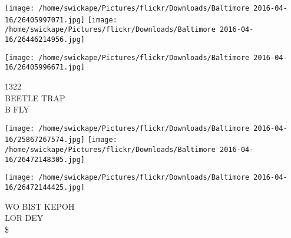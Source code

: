 \documentclass[10pt,letterpaper]{article}
\begin{document}
\texttt{[image: /home/swickape/Pictures/flickr/Downloads/Baltimore 2016-04-16/26405997071.jpg]}
\texttt{[image: /home/swickape/Pictures/flickr/Downloads/Baltimore 2016-04-16/26446214956.jpg]}

\vspace{0.25in}
\texttt{[image: /home/swickape/Pictures/flickr/Downloads/Baltimore 2016-04-16/26405996671.jpg]}

1322\\
BEETLE TRAP\\
B FLY\\
\pagebreak

\texttt{[image: /home/swickape/Pictures/flickr/Downloads/Baltimore 2016-04-16/25867267574.jpg]}
\texttt{[image: /home/swickape/Pictures/flickr/Downloads/Baltimore 2016-04-16/26472148305.jpg]}

\texttt{[image: /home/swickape/Pictures/flickr/Downloads/Baltimore 2016-04-16/26472144425.jpg]}

WO BIST KEPOH\\
LOR DEY\\
\$\\
\pagebreak
\end{document}
